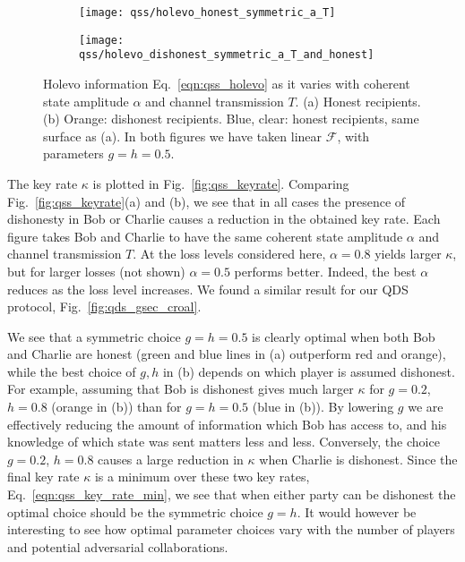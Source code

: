 \begin{figure}[htp]
\captionsetup{width=0.8\linewidth}
\centering
	\begin{subfigure}{0.49\linewidth}
	\centering
	\texttt{[image: qss/holevo\_honest\_symmetric\_a\_T]}
	\caption{}	
	\end{subfigure}
	\begin{subfigure}{0.49\linewidth}
	\centering
	\texttt{[image: qss/holevo\_dishonest\_symmetric\_a\_T\_and\_honest]}
	\caption{}	
	\end{subfigure}
\caption{\label{fig:qss_holevo_information} Holevo information Eq.~\ref{eqn:qss_holevo} as it varies with coherent state amplitude $\alpha$ and channel transmission $T$. (a) Honest recipients. (b) Orange: dishonest recipients. Blue, clear: honest recipients, same surface as (a). In both figures we have taken linear $\mathcal{F}$, with parameters $g = h = 0.5$.}
\end{figure}

The key rate $\kappa$ is plotted in Fig.~\ref{fig:qss_keyrate}. Comparing Fig.~\ref{fig:qss_keyrate}(a) and (b), we see that in all cases the presence of dishonesty in Bob or Charlie causes a reduction in the obtained key rate. Each figure takes Bob and Charlie to have the same coherent state amplitude $\alpha$ and channel transmission $T$. At the loss levels considered here, $\alpha=0.8$ yields larger $\kappa$, but for larger losses (not shown) $\alpha=0.5$ performs better. Indeed, the best $\alpha$ reduces as the loss level increases. We found a similar result for our QDS protocol, Fig.~\ref{fig:qds_gsec_croal}.

We see that a symmetric choice $g = h = 0.5$ is clearly optimal when both Bob and Charlie are honest (green and blue lines in (a) outperform red and orange), while the best choice of $g, h$ in (b) depends on which player is assumed dishonest. For example, assuming that Bob is dishonest gives much larger $\kappa$ for $g=0.2$, $h=0.8$ (orange in (b)) than for $g = h = 0.5$ (blue in (b)). By lowering $g$ we are effectively reducing the amount of information which Bob has access to, and his knowledge of which state was sent matters less and less. Conversely, the choice $g=0.2$, $h=0.8$ causes a large reduction in $\kappa$ when Charlie is dishonest. Since the final key rate $\kappa$ is a minimum over these two key rates, Eq.~\ref{eqn:qss_key_rate_min}, we see that when either party can be dishonest the optimal choice should be the symmetric choice $g=h$. It would however be interesting to see how optimal parameter choices vary with the number of players and potential adversarial collaborations.



